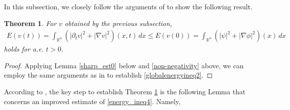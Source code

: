 \documentclass[12pt,twoside,reqno]{amsart}
\newtheorem{theorem}{Theorem}            %
\theoremstyle{definition}              %
\theoremstyle{remark}                  %
\renewcommand{\1}{\mathbbm{1}}                                      %
\numberwithin{equation}{section}
\numberwithin{definition}{section}
\numberwithin{theorem}{section}
\numberwithin{remark}{section}
\begin{document}
In this subsection, we closely follow the arguments of \cite{Serra-Tilli2012} to show the following result.
\begin{theorem}\label{globalenergyineq1}
For $v$ obtained by the previous subsection, 
\begin{align}\label{globalenergyineq2}
{E}(v(t))
=\int_{\mathbb{R}^n}(|\partial_tv|^2+|\nabla v|^2)(x,t)\,dx
\le {E}(v(0))=\int_{\mathbb{R}^n}(|\psi|^2+|\nabla \phi|^2)(x)\,dx    
\end{align}
holds for a.e. $t>0$.
\end{theorem}
\begin{proof} Applying
Lemma \ref{sharp_est0} below and \eqref{non-negativity} above, we can employ the same arguments as in 
\cite[pages 1572-1573]{Serra-Tilli2012} to establish \eqref{globalenergyineq2}.   
\end{proof}


According to \cite{Serra-Tilli2012}, the key step to establish Theorem \ref{globalenergyineq1} is the following Lemma
that concerns an improved estimate of \eqref{energy_ineq4}. Namely, 
\end{document}
